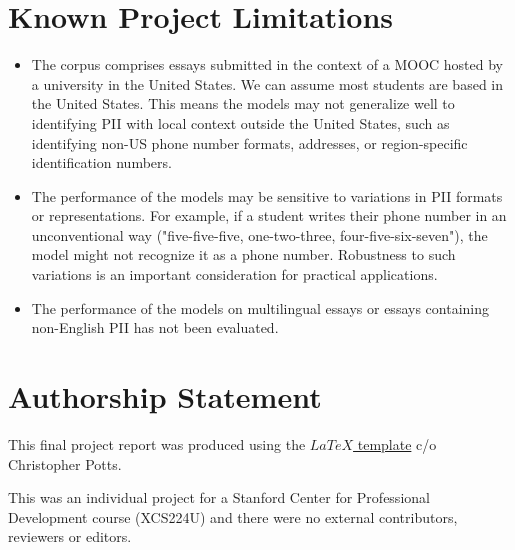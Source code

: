 \documentclass[11pt]{article}
\begin{document}
\section*{Known Project Limitations}

\begin{itemize}

\item The corpus comprises essays submitted in the context of a MOOC hosted by a university in the United States. We can assume most students are based in the United States. This means the models may not generalize well to identifying PII with local context outside the United States, such as identifying non-US phone number formats, addresses, or region-specific identification numbers.

\item The performance of the models may be sensitive to variations in PII formats or representations. For example, if a student writes their phone number in an unconventional way ("five-five-five, one-two-three, four-five-six-seven"), the model might not recognize it as a phone number. Robustness to such variations is an important consideration for practical applications.

\item The performance of the models on multilingual essays or essays containing non-English PII has not been evaluated.

\end{itemize}

\section*{Authorship Statement}

This final project report was produced using the \href{https://www.overleaf.com/project/6237af8bd773a40c9da88358}{$LaTeX$ template} c/o Christopher Potts.

This was an individual project for a Stanford Center for Professional Development course (XCS224U) and there were no external contributors, reviewers or editors.


\end{document}
